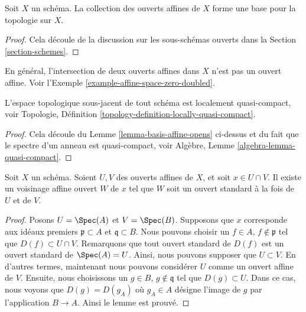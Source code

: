 \begin{lemma}
\label{lemma-basis-affine-opens}
Soit  $X$  un schéma. La collection des ouverts affines de  $X$ 
forme une base pour la topologie sur  $X$.
\end{lemma}

\begin{proof}
Cela découle de la discussion sur les sous-schémas ouverts dans la Section
 \ref{section-schemes}.
\end{proof}

\begin{remark}
\label{remark-intersection-affine-opens}
En général, l'intersection de deux ouverts affines dans  $X$  n'est pas un
ouvert affine. Voir l'Exemple  \ref{example-affine-space-zero-doubled}.
\end{remark}

\begin{lemma}
\label{lemma-locally-quasi-compact}
L'espace topologique sous-jacent de tout schéma est localement quasi-compact, voir
Topologie, Définition  \ref{topology-definition-locally-quasi-compact}.
\end{lemma}

\begin{proof}
Cela découle du Lemme  \ref{lemma-basis-affine-opens}  ci-dessus et du fait que le spectre d'un anneau
est quasi-compact, voir Algèbre, Lemme  \ref{algebra-lemma-quasi-compact}.
\end{proof}

\begin{lemma}
\label{lemma-standard-open-two-affines}
Soit  $X$  un schéma. Soient  $U, V$  des ouverts affines de
 $X$, et soit  $x \in U \cap V$. Il existe un voisinage affine ouvert
 $W$  de  $x$  tel que  $W$  soit un ouvert standard à la
fois de  $U$  et de  $V$.
\end{lemma}

\begin{proof}
Posons  $U = \Spec(A)$  et  $V = \Spec(B)$. Supposons que  $x$  corresponde aux idéaux premiers
 $\mathfrak p \subset A$  et  $\mathfrak q \subset B$. Nous pouvons choisir un  $f \in A$,
 $f \not \in \mathfrak p$  tel que  $D(f) \subset U \cap V$. Remarquons que tout ouvert standard de
 $D(f)$  est un ouvert standard de  $\Spec(A) = U$. Ainsi, nous pouvons
supposer que  $U \subset V$. En d'autres termes, maintenant nous pouvons considérer
 $U$  comme un ouvert affine de  $V$. Ensuite, nous choisissons
un  $g \in B$,  $g \not \in \mathfrak q$  tel que  $D(g) \subset U$. Dans ce cas, nous voyons que
 $D(g) = D(g_A)$  où  $g_A \in A$  désigne l'image de  $g$  par l'application
 $B \to A$. Ainsi le lemme est prouvé.
\end{proof}

